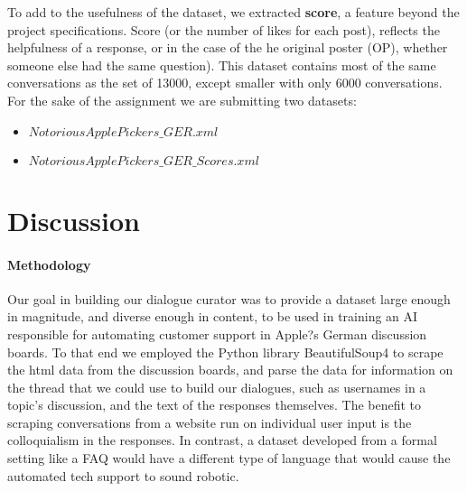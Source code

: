\documentclass[10pt]{article}
\begin{document}
\begin{multicols}{2}
To add to the usefulness of the dataset, we extracted \textbf{score}, a feature beyond the project specifications. Score (or the number of likes for each post), reflects the helpfulness of a response, or in the case of the he original poster (OP), whether someone else had the same question). This dataset contains most of the same conversations as the set of 13000, except smaller with only 6000 conversations. For the sake of the assignment we are submitting two datasets:
\begin{itemize}
\item{$NotoriousApplePickers\_GER.xml$}
\item{$NotoriousApplePickers\_GER\_Scores.xml$}
\end{itemize}




\section{Discussion}
\paragraph{Methodology}
Our goal in building our dialogue curator was to provide a dataset large enough in magnitude, and diverse enough in content, to be used in training an AI responsible for automating customer support in Apple?s German discussion boards. To that end we employed the Python library BeautifulSoup4 to scrape the html data from the discussion boards, and parse the data for information on the thread that we could use to build our dialogues, such as usernames in a topic's discussion, and the text of the responses themselves. The benefit to scraping conversations from a website run on individual user input is the colloquialism in the responses. In contrast, a dataset developed from a formal setting like a FAQ would have a different type of language that would cause the automated tech support to sound robotic.\\


\end{multicols}
\end{document}
